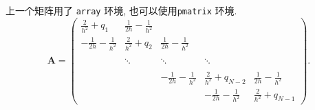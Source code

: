 上一个矩阵用了 \verb|array| 环境, 也可以使用\verb|pmatrix| 环境.
\begin{equation}\label{eq:matrix3}
\boldsymbol{A}=\begin{pmatrix}
\frac{2}{h^{2}}+q_{1} & \frac{1}{2h}-\frac{1}{h^{2}} &   &  &  \\[8pt]
 -\frac{1}{2h}-\frac{1}{h^{2}} & \frac{2}{h^{2}}+q_{2} & \frac{1}{2h}-\frac{1}{h^{2}}  & &  \\[8pt]
  &  &  &  &    \\
  &  \ddots  & \ddots  &  \ddots  &  \\[8pt]
  &  &  &  &    \\
  &   & -\frac{1}{2h}-\frac{1}{h^{2}} & \frac{2}{h^{2}}+q_{N-2}& \frac{1}{2h}-\frac{1}{h^{2}} \\[8pt]
  &  &  & -\frac{1}{2h}-\frac{1}{h^{2}} & \frac{2}{h^{2}}+q_{N-1}
\end{pmatrix}.
\end{equation}
